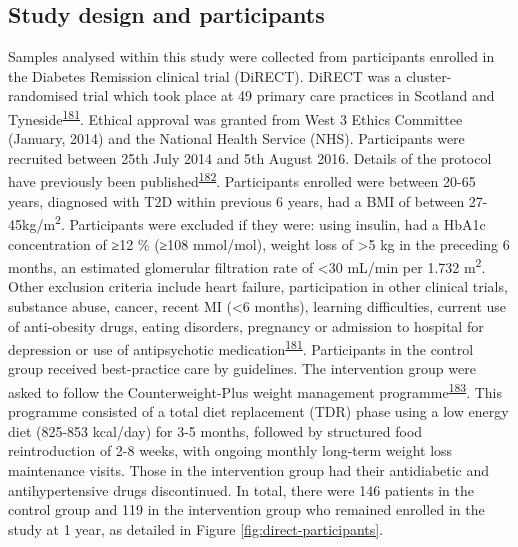 \documentclass[11pt,twoside]{bristolthesis}
\begin{document}
\hypertarget{study-design-and-participants}{%
\subsection{Study design and participants}\label{study-design-and-participants}}

Samples analysed within this study were collected from participants enrolled in the Diabetes Remission clinical trial (DiRECT). DiRECT was a cluster-randomised trial which took place at 49 primary care practices in Scotland and Tyneside\textsuperscript{\protect\hyperlink{ref-Lean2018}{181}}. Ethical approval was granted from West 3 Ethics Committee (January, 2014) and the National Health Service (NHS). Participants were recruited between 25th July 2014 and 5th August 2016. Details of the protocol have previously been published\textsuperscript{\protect\hyperlink{ref-Leslie2016}{182}}. Participants enrolled were between 20-65 years, diagnosed with T2D within previous 6 years, had a BMI of between 27-45kg/m\textsuperscript{2}. Participants were excluded if they were: using insulin, had a HbA1c concentration of ≥12 \% (≥108 mmol/mol), weight loss of \textgreater5 kg in the preceding 6 months, an estimated glomerular filtration rate of \textless30 mL/min per 1.732 m\textsuperscript{2}. Other exclusion criteria include heart failure, participation in other clinical trials, substance abuse, cancer, recent MI (\textless6 months), learning difficulties, current use of anti-obesity drugs, eating disorders, pregnancy or admission to hospital for depression or use of antipsychotic medication\textsuperscript{\protect\hyperlink{ref-Lean2018}{181}}. Participants in the control group received best-practice care by guidelines. The intervention group were asked to follow the Counterweight-Plus weight management programme\textsuperscript{\protect\hyperlink{ref-Lean2013}{183}}. This programme consisted of a total diet replacement (TDR) phase using a low energy diet (825-853 kcal/day) for 3-5 months, followed by structured food reintroduction of 2-8 weeks, with ongoing monthly long-term weight loss maintenance visits. Those in the intervention group had their antidiabetic and antihypertensive drugs discontinued. In total, there were 146 patients in the control group and 119 in the intervention group who remained enrolled in the study at 1 year, as detailed in Figure \ref{fig:direct-participants}.
\end{document}
